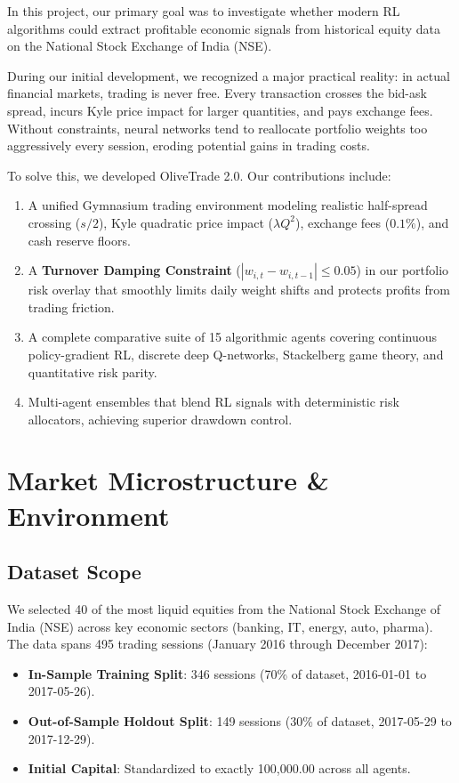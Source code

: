 \documentclass[10pt,journal,compsoc]{IEEEtran}
\begin{document}
In this project, our primary goal was to investigate whether modern RL algorithms could extract profitable economic signals from historical equity data on the National Stock Exchange of India (NSE). 

During our initial development, we recognized a major practical reality: in actual financial markets, trading is never free. Every transaction crosses the bid-ask spread, incurs Kyle price impact for larger quantities, and pays exchange fees. Without constraints, neural networks tend to reallocate portfolio weights too aggressively every session, eroding potential gains in trading costs. 

To solve this, we developed OliveTrade 2.0. Our contributions include:
\begin{enumerate}
    \item A unified Gymnasium trading environment modeling realistic half-spread crossing ($s/2$), Kyle quadratic price impact ($\lambda Q^2$), exchange fees ($0.1\%$), and cash reserve floors.
    \item A \textbf{Turnover Damping Constraint} ($|w_{i,t} - w_{i,t-1}| \le 0.05$) in our portfolio risk overlay that smoothly limits daily weight shifts and protects profits from trading friction.
    \item A complete comparative suite of 15 algorithmic agents covering continuous policy-gradient RL, discrete deep Q-networks, Stackelberg game theory, and quantitative risk parity.
    \item Multi-agent ensembles that blend RL signals with deterministic risk allocators, achieving superior drawdown control.
\end{enumerate}

\section{Market Microstructure \& Environment}

\subsection{Dataset Scope}
We selected 40 of the most liquid equities from the National Stock Exchange of India (NSE) across key economic sectors (banking, IT, energy, auto, pharma). The data spans 495 trading sessions (January 2016 through December 2017):
\begin{itemize}
    \item \textbf{In-Sample Training Split}: 346 sessions (70\% of dataset, 2016-01-01 to 2017-05-26).
    \item \textbf{Out-of-Sample Holdout Split}: 149 sessions (30\% of dataset, 2017-05-29 to 2017-12-29).
    \item \textbf{Initial Capital}: Standardized to exactly \text{\rupee} 100,000.00 across all agents.
\end{itemize}
\end{document}
